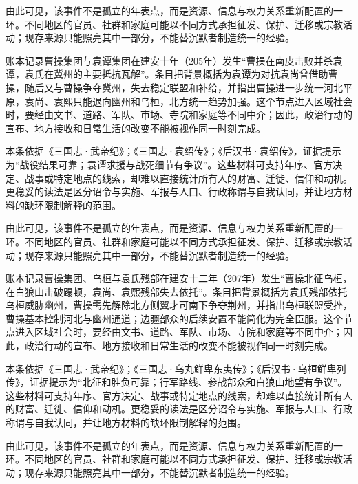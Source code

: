 由此可见，该事件不是孤立的年表点，而是资源、信息与权力关系重新配置的一环。不同地区的官员、社群和家庭可能以不同方式承担征发、保护、迁移或宗教活动；现存来源只能照亮其中一部分，不能替沉默者制造统一的经验。

账本记录曹操集团与袁谭集团在建安十年（205年）发生“曹操在南皮击败并杀袁谭，袁氏在冀州的主要抵抗瓦解”。条目把背景概括为袁谭为对抗袁尚曾借助曹操，随后又与曹操争夺冀州，失去稳定联盟和补给，并指出曹操进一步统一河北平原，袁尚、袁熙只能退向幽州和乌桓，北方统一趋势加强。这个节点进入区域社会时，要经由文书、道路、军队、市场、寺院和家庭等不同中介；因此，政治行动的宣布、地方接收和日常生活的改变不能被视作同一时刻完成。

本条依据《三国志·武帝纪》；《三国志·袁绍传》；《后汉书·袁绍传》，证据提示为“战役结果可靠；袁谭求援与战死细节有争议”。这些材料可支持年序、官方决定、战事或特定地点的线索，却难以直接统计所有人的财富、迁徙、信仰和动机。更稳妥的读法是区分诏令与实施、军报与人口、行政称谓与自我认同，并让地方材料的缺环限制解释的范围。

由此可见，该事件不是孤立的年表点，而是资源、信息与权力关系重新配置的一环。不同地区的官员、社群和家庭可能以不同方式承担征发、保护、迁移或宗教活动；现存来源只能照亮其中一部分，不能替沉默者制造统一的经验。

账本记录曹操集团、乌桓与袁氏残部在建安十二年（207年）发生“曹操北征乌桓，在白狼山击破蹋顿，袁尚、袁熙残部失去依托”。条目把背景概括为袁氏残部依托乌桓威胁幽州，曹操需先解除北方侧翼才可南下争夺荆州，并指出乌桓联盟受挫，曹操基本控制河北与幽州通道；边疆部众的后续安置不能简化为完全臣服。这个节点进入区域社会时，要经由文书、道路、军队、市场、寺院和家庭等不同中介；因此，政治行动的宣布、地方接收和日常生活的改变不能被视作同一时刻完成。

本条依据《三国志·武帝纪》；《三国志·乌丸鲜卑东夷传》；《后汉书·乌桓鲜卑列传》，证据提示为“北征和胜负可靠；行军路线、参战部众和白狼山地望有争议”。这些材料可支持年序、官方决定、战事或特定地点的线索，却难以直接统计所有人的财富、迁徙、信仰和动机。更稳妥的读法是区分诏令与实施、军报与人口、行政称谓与自我认同，并让地方材料的缺环限制解释的范围。

由此可见，该事件不是孤立的年表点，而是资源、信息与权力关系重新配置的一环。不同地区的官员、社群和家庭可能以不同方式承担征发、保护、迁移或宗教活动；现存来源只能照亮其中一部分，不能替沉默者制造统一的经验。

